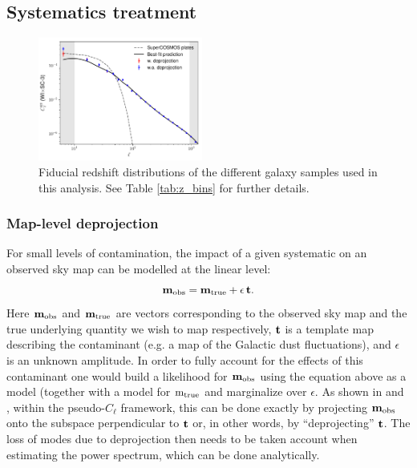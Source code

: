 \documentclass[useAMS,usenatbib]{mn2e}
\begin{document}
  \subsection{Systematics treatment}\label{ssec:methods.syst}
    \begin{figure}
      \centering
      \includegraphics[width=0.48\textwidth]{./figures/cl_syst_summary.pdf}
      \caption{Fiducial redshift distributions of the different galaxy samples used in this analysis. See Table \ref{tab:z_bins} for further details.}
      \label{fig:clsyst}
    \end{figure}
    \subsubsection{Map-level deprojection}\label{sssec:methods.syst.deproj}
      For small levels of contamination, the impact of a given systematic on an observed sky map can be modelled at the linear level:
      \begin{equation}
        {\bf m}_{\rm obs}={\bf m}_{\rm true} + \epsilon\,{\bf t}.
      \end{equation}
      Here ${\bf m}_{\rm obs}$ and ${\bf m}_{\rm true}$ are vectors corresponding to the observed sky map and the true underlying quantity we wish to map respectively, ${\bf t}$ is a template map describing the contaminant (e.g. a map of the Galactic dust fluctuations), and $\epsilon$ is an unknown amplitude. In order to fully account for the effects of this contaminant one would build a likelihood for ${\bf m}_{\rm obs}$ using the equation above as a model (together with a model for ${\rm m}_{\rm true}$ and marginalize over $\epsilon$. As shown in \cite{2017MNRAS.465.1847E} and \cite{2019MNRAS.484.4127A}, within the pseudo-$C_\ell$ framework, this can be done exactly by projecting ${\bf m}_{\rm obs}$ onto the subspace perpendicular to ${\bf t}$ or, in other words, by ``deprojecting'' ${\bf t}$. The loss of modes due to deprojection then needs to be taken account when estimating the power spectrum, which can be done analytically.
\end{document}
